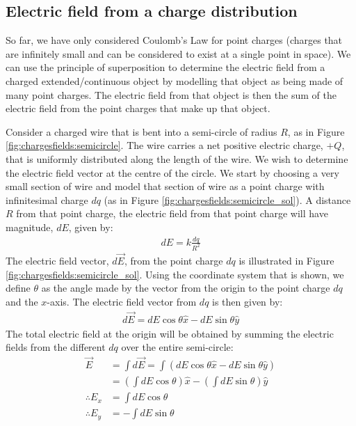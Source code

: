 \subsection{Electric field from a charge distribution}
So far, we have only considered Coulomb's Law for point charges (charges that are infinitely small and can be considered to exist at a single point in space). We can use the principle of superposition to determine the electric field from a charged extended/continuous object by modelling that object as being made of many point charges. The electric field from that object is then the sum of the electric field from the point charges that make up that object. 

Consider a charged wire that is bent into a semi-circle of radius $R$, as in Figure \ref{fig:chargesfields:semicircle}. The wire carries a net positive electric charge, $+Q$, that is uniformly distributed along the length of the wire. We wish to determine the electric field vector at the centre of the circle. 
We start by choosing a very small section of wire and model that section of wire as a point charge with infinitesimal charge $dq$ (as in Figure \ref{fig:chargesfields:semicircle_sol}). A distance $R$ from that point charge, the electric field from that point charge will have magnitude, $dE$, given by:
\begin{align*}
dE=k\frac{dq}{R^2}
\end{align*}
The electric field vector, $d\vec E$, from the point charge $dq$ is illustrated in Figure \ref{fig:chargesfields:semicircle_sol}.
Using the coordinate system that is shown, we define $\theta$ as the angle made by the vector from the origin to the point charge $dq$ and the $x$-axis. The electric field vector from $dq$ is then given by:
\begin{align*}
d\vec E = dE\cos\theta \hat x - dE\sin\theta \hat y
\end{align*}
The total electric field at the origin will be obtained by summing the electric fields from the different $dq$ over the entire semi-circle:
\begin{align*}
\vec E &= \int d\vec E = \int \left(dE\cos\theta \hat x - dE\sin\theta \hat y\right)\\
&=\left( \int dE\cos\theta \right)\hat x -\left( \int dE\sin\theta \right)\hat y\\
\therefore E_x &= \int dE\cos\theta\\
\therefore E_y &= -\int dE\sin\theta\\
\end{align*}
